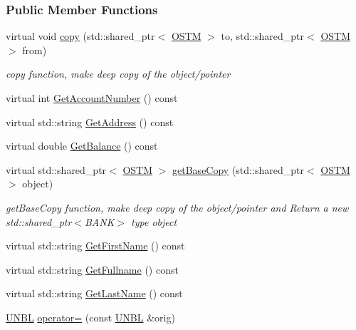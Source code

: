\subsubsection*{Public Member Functions}
\begin{DoxyCompactItemize}
\item 
virtual void \hyperlink{class_u_n_b_l_a14d5e1adc618827667d8d9524abaf31b_a14d5e1adc618827667d8d9524abaf31b}{copy} (std\+::shared\+\_\+ptr$<$ \hyperlink{class_o_s_t_m}{O\+S\+TM} $>$ to, std\+::shared\+\_\+ptr$<$ \hyperlink{class_o_s_t_m}{O\+S\+TM} $>$ from)
\begin{DoxyCompactList}\small\item\em copy function, make deep copy of the object/pointer \end{DoxyCompactList}\item 
virtual int \hyperlink{class_u_n_b_l_a44a84fb7fe8778e3048921581049c715_a44a84fb7fe8778e3048921581049c715}{Get\+Account\+Number} () const 
\item 
virtual std\+::string \hyperlink{class_u_n_b_l_a74f8896be6e93ad8f89ca3b0da83525a_a74f8896be6e93ad8f89ca3b0da83525a}{Get\+Address} () const 
\item 
virtual double \hyperlink{class_u_n_b_l_ad5b882bff8d1e2619b2ebbd170345c99_ad5b882bff8d1e2619b2ebbd170345c99}{Get\+Balance} () const 
\item 
virtual std\+::shared\+\_\+ptr$<$ \hyperlink{class_o_s_t_m}{O\+S\+TM} $>$ \hyperlink{class_u_n_b_l_a5dfe7f9e5fbb66abff9a73e40e803887_a5dfe7f9e5fbb66abff9a73e40e803887}{get\+Base\+Copy} (std\+::shared\+\_\+ptr$<$ \hyperlink{class_o_s_t_m}{O\+S\+TM} $>$ object)
\begin{DoxyCompactList}\small\item\em get\+Base\+Copy function, make deep copy of the object/pointer and Return a new std\+::shared\+\_\+ptr$<$\+B\+A\+N\+K$>$ type object \end{DoxyCompactList}\item 
virtual std\+::string \hyperlink{class_u_n_b_l_ae89215b95f2e11aa70f9c8bbfd55c10c_ae89215b95f2e11aa70f9c8bbfd55c10c}{Get\+First\+Name} () const 
\item 
virtual std\+::string \hyperlink{class_u_n_b_l_a4292e9cafc42be3d9f4f3d6221bc9638_a4292e9cafc42be3d9f4f3d6221bc9638}{Get\+Fullname} () const 
\item 
virtual std\+::string \hyperlink{class_u_n_b_l_a27f19f2af5e1abd33b5c63f16b493f6c_a27f19f2af5e1abd33b5c63f16b493f6c}{Get\+Last\+Name} () const 
\item 
\hyperlink{class_u_n_b_l}{U\+N\+BL} \hyperlink{class_u_n_b_l_a32ab1105494f18bdb33e651e9bbfcd02_a32ab1105494f18bdb33e651e9bbfcd02}{operator=} (const \hyperlink{class_u_n_b_l}{U\+N\+BL} \&orig)

\end{DoxyCompactItemize}
